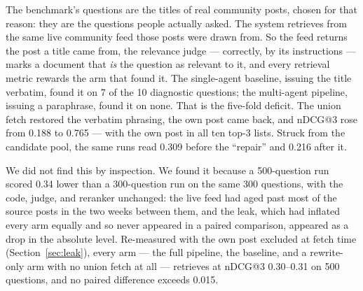 \documentclass[acmsmall,review,anonymous,screen]{acmart}
\begin{document}
The benchmark's questions are the titles of real community posts, chosen for
that reason: they are the questions people actually asked. The system retrieves
from the same live community feed those posts were drawn from. So the feed
returns the post a title came from, the relevance judge --- correctly, by its
instructions --- marks a document that \emph{is} the question as relevant to
it, and every retrieval metric rewards the arm that found it. The single-agent
baseline, issuing the title verbatim, found it on 7 of the 10 diagnostic
questions; the multi-agent pipeline, issuing a paraphrase, found it on none.
That is the five-fold deficit. The union fetch restored the verbatim phrasing,
the own post came back, and nDCG@3 rose from 0.188 to 0.765 --- with the own
post in all ten top-3 lists. Struck from the candidate pool, the same runs read
0.309 before the ``repair'' and 0.216 after it.

We did not find this by inspection. We found it because a 500-question run
scored 0.34 lower than a 300-question run on the same 300 questions, with the
code, judge, and reranker unchanged: the live feed had aged past most of the
source posts in the two weeks between them, and the leak, which had inflated
every arm equally and so never appeared in a paired comparison, appeared as a
drop in the absolute level. Re-measured with the own post excluded at fetch time
(Section~\ref{sec:leak}), every arm --- the full pipeline, the baseline, and a
rewrite-only arm with no union fetch at all --- retrieves at nDCG@3 0.30--0.31
on 500 questions, and no paired difference exceeds 0.015.
\end{document}
